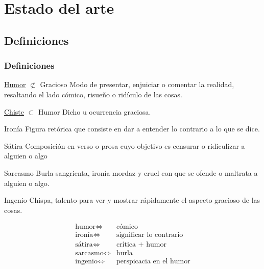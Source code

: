 \section{Estado del arte}

\subsection{Definiciones}
\begin{frame}[allowframebreaks]
    \frametitle{Definiciones}

    \begin{block}{\underline{Humor} $\not\subset$ Gracioso}
        Modo de presentar, enjuiciar o comentar la realidad, resaltando el lado cómico, risueño o ridículo de las cosas.  
    \end{block}
    \begin{block}{\underline{Chiste} $\subset$ Humor}
        Dicho u ocurrencia graciosa.
    \end{block}

    \framebreak

    \begin{block}{Ironía}
        Figura retórica que consiste en dar a entender lo contrario a lo que se dice.
    \end{block}
    \begin{block}{Sátira}
        Composición en verso o prosa cuyo objetivo es censurar o ridiculizar a alguien o algo
    \end{block}
    \begin{block}{Sarcasmo}
        Burla sangrienta, ironía mordaz y cruel con que se ofende o maltrata a alguien o algo.
    \end{block}
    \begin{block}{Ingenio}
        Chispa, talento para ver y mostrar rápidamente el aspecto gracioso de las cosas.
    \end{block}

    \framebreak
        
    \begin{eqnarray*} %
        \text{humor} \iff&  \text{cómico} \\
        \text{ironía} \iff& \text{significar lo contrario} \\
        \text{sátira} \iff& \text{crítica + humor} \\
        \text{sarcasmo} \iff& \text{burla} \\
        \text{ingenio}  \iff& \text{perspicacia en el humor}
    \end{eqnarray*}
\end{frame}

